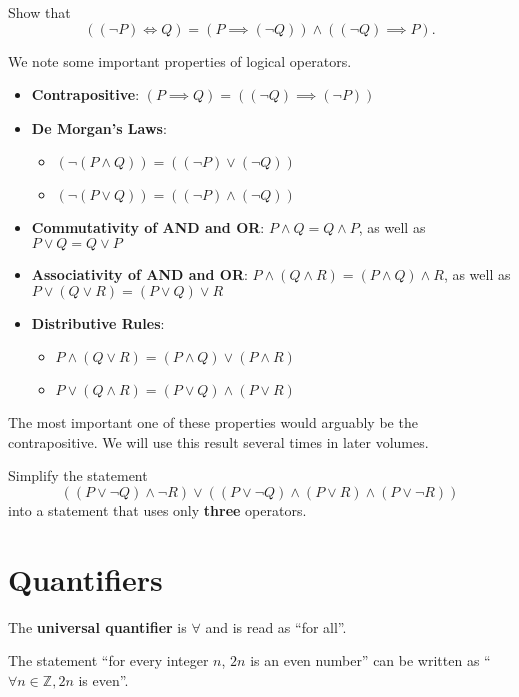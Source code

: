 \begin{exercise}
    Show that
    \[
        ((\lnot P) \iff Q) = (P \implies (\lnot Q)) \land ((\lnot Q) \implies P).
    \]
\end{exercise}

We note some important properties of logical operators.
\begin{itemize}
    \item \textbf{Contrapositive}: $(P \implies Q) = ((\lnot Q) \implies (\lnot P))$
    \item \textbf{De Morgan's Laws}: \begin{itemize}
        \item $(\lnot (P \land Q)) = ((\lnot P) \lor (\lnot Q))$
        \item $(\lnot (P \lor Q)) = ((\lnot P) \land (\lnot Q))$
    \end{itemize}
    \item \textbf{Commutativity of AND and OR}: $P \land Q = Q \land P$, as well as $P \lor Q = Q \lor P$
    \item \textbf{Associativity of AND and OR}: $P \land (Q \land R) = (P \land Q) \land R$, as well as $P \lor (Q \lor R) = (P \lor Q) \lor R$
    \item \textbf{Distributive Rules}: \begin{itemize}
        \item $P \land (Q \lor R) = (P \land Q) \lor (P \land R)$
        \item $P \lor (Q \land R) = (P \lor Q) \land (P \lor R)$
    \end{itemize}
\end{itemize}
\begin{remark}
    The most important one of these properties would arguably be the contrapositive. We will use this result several times in later volumes.
\end{remark}
\begin{exercise}
    Simplify the statement
    \[
        ((P \lor \lnot Q) \land \lnot R) \lor ((P \lor \lnot Q) \land (P \lor R) \land (P \lor \lnot R))
    \]
    into a statement that uses only \textbf{three} operators.
\end{exercise}

\section{Quantifiers}
\begin{definition}
    The \textbf{universal quantifier} is $\forall$ and is read as ``for all''.
\end{definition}
\begin{example}
    The statement ``for every integer $n$, $2n$ is an even number'' can be written as ``$\forall n \in \mathbb{Z}, 2n$ is even''.
\end{example}

